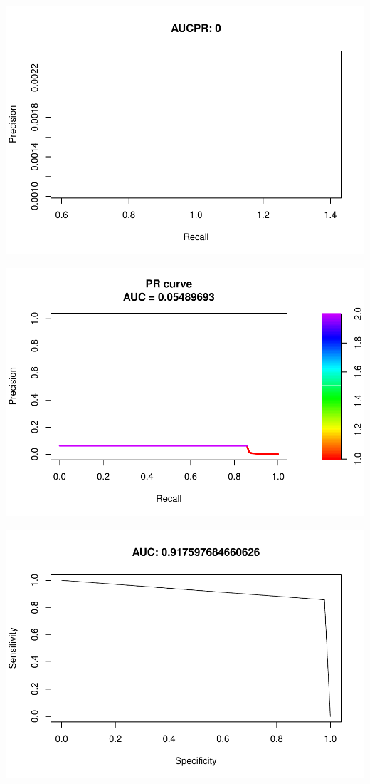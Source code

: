 \documentclass[]{article}
\begin{document}
\begin{center}\includegraphics{Credit_Card_Fraud_Detection_Project_Report_files/figure-latex/unnamed-chunk-25-6} \end{center}

\begin{center}\includegraphics{Credit_Card_Fraud_Detection_Project_Report_files/figure-latex/unnamed-chunk-25-7} \end{center}

\begin{center}\includegraphics{Credit_Card_Fraud_Detection_Project_Report_files/figure-latex/unnamed-chunk-25-8} \end{center}
\end{document}
